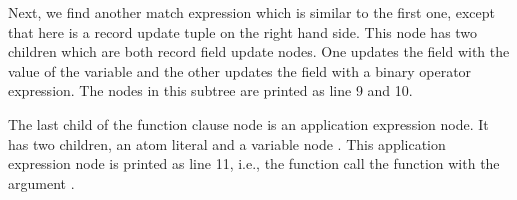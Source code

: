 Next, we find another match expression which is similar to the first one, except that here is a record update tuple on the right hand side. This node has two children which are both record field update nodes. One updates the  field with the value of the variable  and the other updates the  field with a binary operator expression. The nodes in this subtree are printed as line 9 and 10.

The last child of the function clause node is an application expression node. It has two children, an atom literal  and a variable node . This application expression node is printed as line 11, i.e., the function call the  function with the argument .
